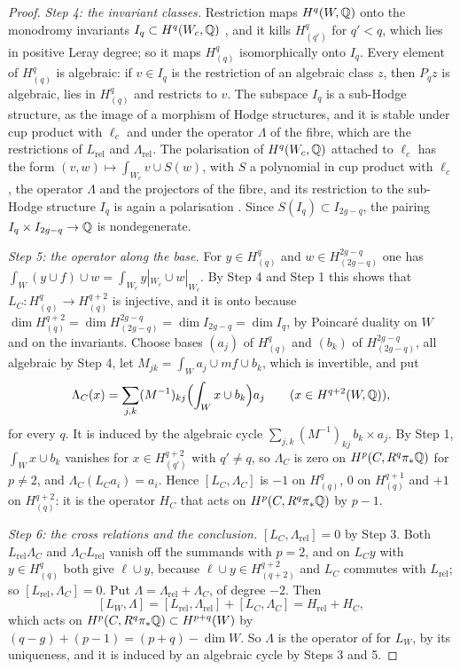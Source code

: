 \begin{proof}
\emph{Step 4: the invariant classes.} Restriction maps $H^{q}(W,\mathbb{Q})$ onto the
monodromy invariants $I_{q}\subset H^{q}(W_{c},\mathbb{Q})$ \cite[4.1.1(ii)]{Del71},
and it kills $H^{q}_{(q')}$ for $q'<q$, which lies in positive Leray degree;
so it maps $H^{q}_{(q)}$ isomorphically onto $I_{q}$. Every element of
$H^{q}_{(q)}$ is algebraic: if $v\in I_{q}$ is the restriction of an algebraic
class $z$, then $P_{q}z$ is algebraic, lies in $H^{q}_{(q)}$ and restricts to
$v$. The subspace $I_{q}$ is a sub-Hodge structure, as the image of a
morphism of Hodge structures, and it is stable under cup product with
$\ell_{c}$ and under the operator $\Lambda$ of the fibre, which are the
restrictions of $L_{\mathrm{rel}}$ and $\Lambda_{\mathrm{rel}}$. The
polarisation of $H^{q}(W_{c},\mathbb{Q})$ attached to $\ell_{c}$ has the form
$(v,w)\mapsto\int_{W_{c}}v\cup S(w)$, with $S$ a polynomial in cup product
with $\ell_{c}$, the operator $\Lambda$ and the projectors of the fibre, and
its restriction to the sub-Hodge structure $I_{q}$ is again a polarisation
\cite{Voi02}. Since $S(I_{q})\subset I_{2g-q}$, the pairing
$I_{q}\times I_{2g-q}\to\mathbb{Q}$ is nondegenerate.

\emph{Step 5: the operator along the base.} For $y\in H^{q}_{(q)}$ and
$w\in H^{2g-q}_{(2g-q)}$ one has $\int_{W}(y\cup f)\cup w=\int_{W_{c}}
y|_{W_{c}}\cup w|_{W_{c}}$. By Step 4 and Step 1 this shows that
$L_{C}\colon H^{q}_{(q)}\to H^{q+2}_{(q)}$ is injective, and it is onto
because $\dim H^{q+2}_{(q)}=\dim H^{2g-q}_{(2g-q)}=\dim I_{2g-q}=\dim I_{q}$,
by Poincar\'e duality on $W$ and on the invariants. Choose bases $(a_{j})$ of
$H^{q}_{(q)}$ and $(b_{k})$ of $H^{2g-q}_{(2g-q)}$, all algebraic by Step 4,
let $M_{jk}=\int_{W}a_{j}\cup mf\cup b_{k}$, which is invertible, and put
\[
  \Lambda_{C}(x)=\sum_{j,k}(M^{-1})_{kj}\Bigl(\int_{W}x\cup b_{k}\Bigr)a_{j}
  \qquad(x\in H^{q+2}(W,\mathbb{Q})),
\]
for every $q$. It is induced by the algebraic cycle
$\sum_{j,k}(M^{-1})_{kj}\,b_{k}\times a_{j}$. By Step 1, $\int_{W}x\cup b_{k}$
vanishes for $x\in H^{q+2}_{(q')}$ with $q'\ne q$, so $\Lambda_{C}$ is zero
on $H^{p}(C,R^{q}\pi_{*}\mathbb{Q})$ for $p\ne2$, and $\Lambda_{C}(L_{C}a_{i})=a_{i}$.
Hence $[L_{C},\Lambda_{C}]$ is $-1$ on $H_{(q)}^{q}$, $0$ on
$H_{(q)}^{q+1}$ and $+1$ on $H_{(q)}^{q+2}$: it is the operator $H_{C}$ that
acts on $H^{p}(C,R^{q}\pi_{*}\mathbb{Q})$ by $p-1$.

\emph{Step 6: the cross relations and the conclusion.} $[L_{C},
\Lambda_{\mathrm{rel}}]=0$ by Step 3. Both $L_{\mathrm{rel}}\Lambda_{C}$ and
$\Lambda_{C}L_{\mathrm{rel}}$ vanish off the summands with $p=2$, and on
$L_{C}y$ with $y\in H^{q}_{(q)}$ both give $\ell\cup y$, because
$\ell\cup y\in H^{q+2}_{(q+2)}$ and $L_{C}$ commutes with $L_{\mathrm{rel}}$;
so $[L_{\mathrm{rel}},\Lambda_{C}]=0$. Put
$\Lambda=\Lambda_{\mathrm{rel}}+\Lambda_{C}$, of degree $-2$. Then
\[
  [L_{W},\Lambda]=[L_{\mathrm{rel}},\Lambda_{\mathrm{rel}}]+[L_{C},\Lambda_{C}]
  =H_{\mathrm{rel}}+H_{C},
\]
which acts on $H^{p}(C,R^{q}\pi_{*}\mathbb{Q})\subset H^{p+q}(W)$ by
$(q-g)+(p-1)=(p+q)-\dim W$. So $\Lambda$ is the operator of 
for $L_{W}$, by its uniqueness, and it is induced by an algebraic cycle by
Steps 3 and 5.
\end{proof}

